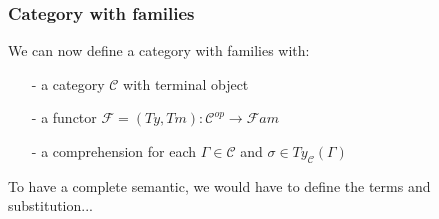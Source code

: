 \documentclass[aspectratio=169]{beamer}
\newcommand{\Fami}{\mathcal{F}am}
\newcommand{\cate}{\mathcal{C}}
\newcommand{\types}{Ty_{\cate}}
\begin{document}
    \begin{frame}
        \frametitle{Category with families}
        We can now define a category with families with:
        \begin{itemize}
            \item[-] a category $\cate$ with terminal object
            \item[-] a functor $\mathcal{F} = (Ty,Tm):\cate^{op}\to \Fami$
            \item[-] a comprehension for each $\Gamma\in\cate$ and $\sigma\in\types(\Gamma)$  
        \end{itemize}
    \vspace{25pt}
    To have a complete semantic, we would have to define the terms and substitution...
\end{frame}
\end{document}
